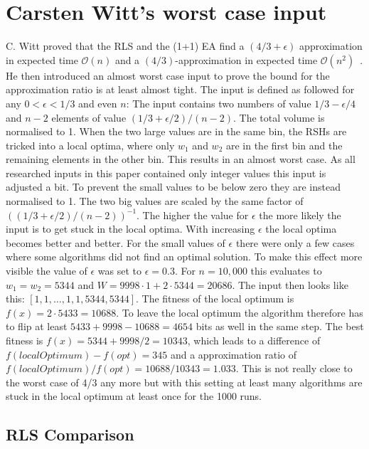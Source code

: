 \section{Carsten Witt's worst case input}
C. Witt proved that the RLS and the (1+1) EA find a $(4/3+\epsilon)$ approximation in expected time $\mathcal{O}(n)$ and a $(4/3)$-approximation in expected time $\mathcal{O}(n^2)$~\cite{witt2005worst}.
He then introduced an almost worst case input to prove the bound for the approximation ratio is at least almost tight.
The input is defined as followed for any $0<\epsilon<1/3$ and even $n$:\newline
The input contains two numbers of value $1/3 - \epsilon/4$ and $n-2$ elements of value $(1/3+\epsilon/2)/(n-2)$. 
The total volume is normalised to 1.
When the two large values are in the same bin, the RSHs are tricked into a local optima, where only $w_1$ and $w_2$ are in the first bin and the remaining elements in the other bin.
This results in an almost worst case.
As all researched inputs in this paper contained only integer values this input is adjusted a bit.
To prevent the small values to be below zero they are instead normalised to 1.
The two big values are scaled by the same factor of $((1/3+\epsilon/2)/(n-2))^{-1}$.
The higher the value for $\epsilon$ the more likely the input is to get stuck in the local optima.
With increasing $\epsilon$ the local optima becomes better and better.
For the small values of $\epsilon$ there were only a few cases where some algorithms did not find an optimal solution.
To make this effect more visible the value of $\epsilon$ was set to $\epsilon=0.3$.\newline
For $n=10,000$ this evaluates to $w_1=w_2=5344$ and $W=9998 \cdot 1 + 2 \cdot 5344 = 20686$.
The input then looks like this: $[1, 1, \dots, 1, 1, 5344, 5344]$.
The fitness of the local optimum is $f(x) = 2 \cdot 5433 = 10688$.
To leave the local optimum the algorithm therefore has to flip at least  $5433+9998-10688 = 4654$ bits as well in the same step.
The best fitness is $f(x) = 5344 + 9998/2 = 10343$, which leads to a difference of $f(localOptimum)-f(opt) = 345$ and a approximation ratio of $f(localOptimum)/f(opt)=10688/10343=1.033$.
This is not really close to the worst case of 4/3 any more but with this setting at least many algorithms are stuck in the local optimum at least once for the 1000 runs.
\subsection{RLS Comparison}


